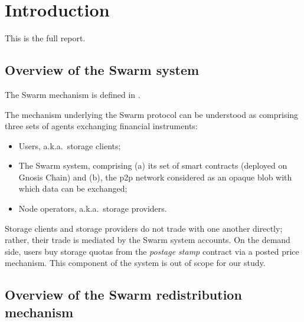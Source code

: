 \maketitle
\section{Introduction}

This is the full report.

\subsection{Overview of the Swarm system}

The Swarm mechanism is defined in \cite{book-of-swarm}.

The mechanism underlying the Swarm protocol can be understood as comprising three sets of agents exchanging financial instruments:
\begin{itemize}
  \item Users, a.k.a.~storage clients;
  \item The Swarm system, comprising (a) its set of smart contracts (deployed on Gnosis Chain) and (b), the p2p network considered as an opaque blob with which data can be exchanged;
  \item Node operators, a.k.a.~storage providers.
\end{itemize}
Storage clients and storage providers do not trade with one another directly; rather, their trade is mediated by the Swarm system accounts.
%
On the demand side, users buy storage quotas from the \emph{postage stamp} contract via a posted price mechanism. This component of the system is out of scope for our study.

\subsection{Overview of the Swarm redistribution mechanism}


